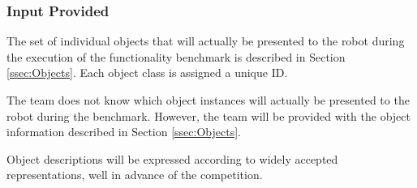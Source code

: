 \subsubsection{Input Provided}
\label{sssec:ObjectPerceptionInput}

The set of individual objects that will actually be presented to the robot during the execution of the functionality benchmark is described in Section \ref{ssec:Objects}. 
Each object class is assigned a unique ID.

The team does not know which object instances will actually be presented to the robot during the benchmark. 
However, the team will be provided with the object information described in Section \ref{ssec:Objects}.
%

Object descriptions will be expressed according to widely accepted representations, well in advance of the competition. 

%

%
%
%
%


